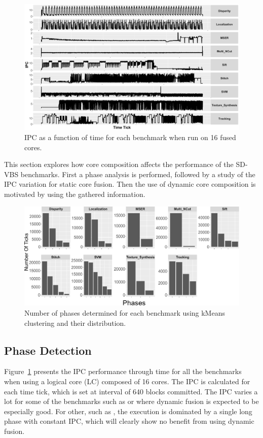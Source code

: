 
\begin{figure}
    \centering
    \includegraphics[width=1\textwidth]{cases-paper/graphics/Exploration/ipcs_16_2.pdf}
    \caption{IPC as a function of time for each benchmark when run on 16 fused cores.}
    \label{fig:sxt}
	\vspace{1em}
\end{figure}

This section explores how core composition affects the performance of the SD-VBS benchmarks.
First a phase analysis is performed, followed by a study of the IPC variation for static core fusion.
Then the use of dynamic core composition is motivated by using the gathered information.


\begin{figure}[t]
    \centering
    \includegraphics[width=1\textwidth]{cases-paper/graphics/Exploration/clusters3.pdf}
    \caption{Number of phases determined for each benchmark using kMeans clustering and their distribution.}
    \label{fig:clust}
		\vspace{5mm}
\end{figure}


\subsection{Phase Detection}
Figure~\ref{fig:sxt} presents the IPC performance through time for all the benchmarks when using a logical core (LC) composed of 16 cores.
The IPC is calculated for each time tick, which is set at interval of 640 blocks committed.
The IPC varies a lot for some of the benchmarks such as  or  where dynamic fusion is expected to be especially good.
For other, such as , the execution is dominated by a single long phase with constant IPC, which will clearly show no benefit from using dynamic fusion.

